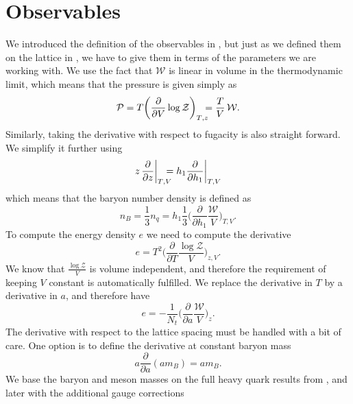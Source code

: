 \section{Observables}

We introduced the definition of the observables in , but
just as we defined them on the lattice in ,
we have to give them in terms of the parameters we are working with. We use the
fact that  $\mathcal{W}$ is linear in volume in the thermodynamic
limit, which means that the pressure is given simply as
%
\begin{equation}
  \mathcal{P} = T \bigg( \frac{\partial}{\partial V} \log \mathcal{Z}
  \bigg)_{T\mathrlap{,z}} = \frac{T}{V}\,\mathcal{W}.
\end{equation}
%
Similarly, taking the derivative with respect to fugacity is also straight
forward. We simplify it further using
%
\begin{equation}
  z\, \frac{\partial}{\partial z} \bigg|_{T\mathrlap{,V}} = h_1
  \frac{\partial}{\partial h_1} \bigg|_{T,V}
\end{equation}
%
which means that the baryon number density is defined as
%
\begin{equation}
  n_B = \frac{1}{3} n_q = h_1 \frac{1}{3} \bigg( \frac{\partial}{\partial h_1} \frac{\mathcal{W}}{V} \bigg)_{T,V}.
\end{equation}
%
To compute the energy density $e$ we need to compute the
derivative
%
\begin{equation}
  e = T^2 \bigg( \frac{\partial}{\partial T} \frac{\log \mathcal{Z}}{V}
    \bigg)_{z,V}.
\end{equation}
%
We know that $\frac{\log \mathcal{Z}}{V}$ is volume independent, and therefore
the requirement of keeping $V$ constant is automatically fulfilled. We replace
the derivative in $T$ by a derivative in $a$, and therefore have
%
\begin{equation}
  e = -\frac{1}{N_t} \bigg( \frac{\partial}{\partial a} \frac{\mathcal{W}}{V}
    \bigg)_z.
\end{equation}
%
The derivative with respect to the lattice spacing must be handled with a bit of
care. One option is to define the derivative at constant baryon mass
%
\begin{equation}
  a \frac{\partial}{\partial a} (a m_B) = a m_B.
\end{equation}
%
We base the baryon and meson masses on the full heavy quark results from
\citep{Smit:2002introduction}, and later with the additional gauge corrections
